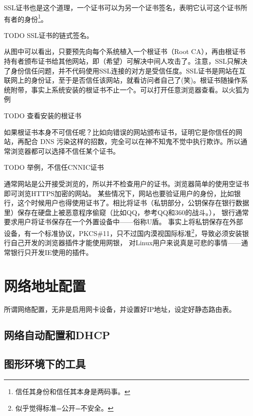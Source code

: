 SSL证书也是这个道理，一个证书可以为另一个证书签名，表明它认可这个证书所有者的身份\footnote{信任其身份和信任其本身是两码事。}。 

TODO SSL证书的链式签名。 %

从图中可以看出，只要预先向每个系统植入一个根证书（Root CA），再由根证书持有者颁布证书给其他网站，即（希望）可解决中间人攻击了。注意，SSL只解决了身份信任问题，并不代码使用SSL连接的对方是受信任度。SSL证书是网站在互联网上的身份证，至于是否信任该网站，就看访问者自己了(笑)。根证书随操作系统附带，事实上系统安装的根证书不止一个。可以打开任意浏览器查看。以火狐为例

TODO 查看安装的根证书 %

如果根证书本身不可信任呢？比如向错误的网站颁布证书，证明它是你信任的网站，再配合 DNS 污染这样的招数，完全可以在神不知鬼不觉中执行欺诈。所以通常浏览器都可以选择不信任某个证书。

TODO 举例，不信任CNNIC证书

通常网站是公开接受浏览的，所以并不检查用户的证书。浏览器简单的使用空证书即可浏览HTTPS加密的网站。
某些情况下，网站也要验证用户的身份，比如银行，这个时候用户也得使用证书了。相比将证书（私钥部分，公钥保存在银行数据里）保存在硬盘上被恶意程序偷窥（比如QQ，参考QQ和360的战斗。），
银行通常要求用户将证书保存在一个外置设备中——俗称U盾。
事实上将私钥保存在外部设备，有一个标准协议，PKCS\#11，只不过国内漠视国际标准\footnote{似乎觉得标准=公开=不安全。}，导致必须安装银行自己开发的浏览器插件才能使用网银，
对Linux用户来说真是可悲的事情——通常银行只开发IE使用的插件。




\section{网络地址配置}\label{sec:ifconfig}

所谓网络配置，无非是启用网卡设备，并设置好IP地址，设定好静态路由表。

\subsection{网络自动配置和DHCP}\label{sec:DHCP}

\subsection{图形环境下的工具}\label{sec:networkmanager}

